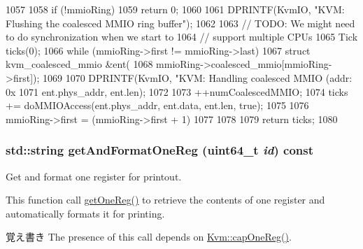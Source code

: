 \begin{DoxyCode}
1057 {
1058     if (!mmioRing)
1059         return 0;
1060 
1061     DPRINTF(KvmIO, "KVM: Flushing the coalesced MMIO ring buffer\n");
1062 
1063     // TODO: We might need to do synchronization when we start to
1064     // support multiple CPUs
1065     Tick ticks(0);
1066     while (mmioRing->first != mmioRing->last) {
1067         struct kvm_coalesced_mmio &ent(
1068             mmioRing->coalesced_mmio[mmioRing->first]);
1069 
1070         DPRINTF(KvmIO, "KVM: Handling coalesced MMIO (addr: 0x%
1071                 ent.phys_addr, ent.len);
1072 
1073         ++numCoalescedMMIO;
1074         ticks += doMMIOAccess(ent.phys_addr, ent.data, ent.len, true);
1075 
1076         mmioRing->first = (mmioRing->first + 1) %
1077     }
1078 
1079     return ticks;
1080 }
\end{DoxyCode}
\hypertarget{classBaseKvmCPU_af080be5963a74cfafcfc1db16f294f1a}{
\subsubsection[{getAndFormatOneReg}]{\setlength{\rightskip}{0pt plus 5cm}std::string getAndFormatOneReg (uint64\_\-t {\em id}) const}}
\label{classBaseKvmCPU_af080be5963a74cfafcfc1db16f294f1a}
Get and format one register for printout.

This function call \hyperlink{classBaseKvmCPU_ab5a47c64ebf5a4de2539c6f71f7acc51}{getOneReg()} to retrieve the contents of one register and automatically formats it for printing.

\begin{DoxyNote}{覚え書き}
The presence of this call depends on \hyperlink{classKvm_af1ad3b73711f45008bcb240d012987f7}{Kvm::capOneReg()}. 
\end{DoxyNote}



